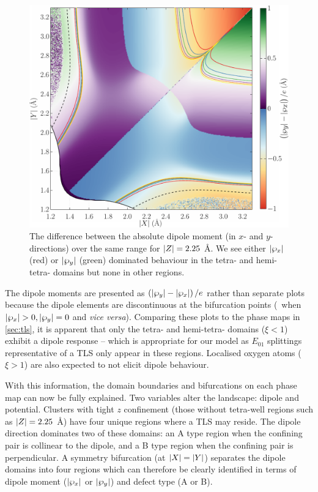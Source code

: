 \begin{figure}[htp]
\includegraphics[width=\textwidth]{figures/dipole225}
  \caption[Dipole Phase Map, With $\abs{Z} = 2.25$ \AA]{\label{fig:dipole225}The difference between the absolute dipole moment (in $x$- and $y$-directions) over the same range for $\abs{Z} = 2.25$ \AA. We see either $\lvert\wp_x\rvert$ (red) or $\lvert\wp_y\rvert$ (green) dominated behaviour in the tetra- and hemi-tetra- domains but none in other regions.}
\end{figure}

The dipole moments are presented as $\left(\lvert\wp_y\rvert-\lvert\wp_x\rvert\right)/e$ rather than separate plots because the dipole elements are discontinuous at the bifurcation points (\ie\ when $\lvert\wp_x\rvert>0, \lvert\wp_y\rvert=0$ and \textit{vice versa}).
Comparing these plots to the phase maps in \cref{sec:tls}, it is apparent that only the tetra- and hemi-tetra- domains ($\xi < 1$) exhibit a dipole response -- which is appropriate for our model as $E_{01}$ splittings representative of a TLS only appear in these regions.
Localised oxygen atoms ($\xi > 1$) are also expected to not elicit dipole behaviour.

With this information, the domain boundaries and bifurcations on each phase map can now be fully explained.
Two variables alter the landscape: dipole and potential.
Clusters with tight $z$ confinement (those without tetra-well regions such as $\abs{Z} = 2.25$ \AA) have four unique regions where a TLS may reside.
The dipole direction dominates two of these domains: an A type region when the confining pair is collinear to the dipole, and a B type region when the confining pair is perpendicular.
A symmetry bifurcation (at $\lvert X\rvert = \lvert Y\rvert$) separates the dipole domains into four regions which can therefore be clearly identified in terms of dipole moment ($\lvert\wp_x\rvert$ or $\lvert\wp_y\rvert$) and defect type (A or B).

